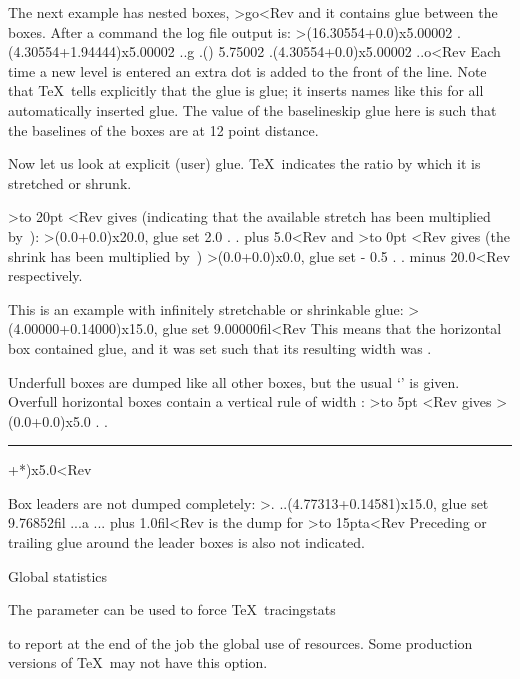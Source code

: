 The next example has nested boxes, 
\Ver>\vbox{\hbox{g}\hbox{o}}<Rev
and it contains  glue between the boxes.
After a  command the log file output is:
\Ver>\vbox(16.30554+0.0)x5.00002
.\hbox(4.30554+1.94444)x5.00002
..\tenroman g
.\glue(\baselineskip) 5.75002
.\hbox(4.30554+0.0)x5.00002
..\tenroman o<Rev
Each time a new level is entered an extra dot is added to
the front of the line. Note that \TeX\ tells explicitly
that the glue is  glue;
it inserts names like this for all automatically inserted glue.
The value of
the baselineskip glue here is such that the baselines of
the boxes are at 12 point distance.

Now let us look at explicit (user) glue. \TeX\ indicates the ratio
by which it is stretched or shrunk. 

\examples
\Ver>\hbox to 20pt {\kern10pt }<Rev
gives (indicating that the available stretch has been 
multiplied by~):
\Ver>\hbox(0.0+0.0)x20.0, glue set 2.0
.
. plus 5.0<Rev
and
\Ver>\hbox to 0pt {\kern10pt }<Rev
gives (the shrink has been multiplied by~)
\Ver>\hbox(0.0+0.0)x0.0, glue set - 0.5
.
. minus 20.0<Rev
respectively.
\>

This is an example with infinitely stretchable or shrinkable
glue:
\Ver>\hbox(4.00000+0.14000)x15.0, glue set 9.00000fil<Rev
This means that the horizontal box contained  glue, and
it was set such that its resulting width was \n{9pt}.

Underfull boxes are dumped like all other boxes, but
the usual `'
is given. Overfull horizontal boxes contain a vertical rule
of width :
\Ver>\hbox to 5pt {\kern10pt}<Rev gives
\Ver>\hbox(0.0+0.0)x5.0
.
.\rule(*+*)x5.0<Rev


Box leaders are not dumped completely:
\Ver>.
..\hbox(4.77313+0.14581)x15.0, glue set 9.76852fil
...\tenrm a
... plus 1.0fil<Rev
is the dump for
\Ver>\leaders\hbox to 15pt{\tenrm a\hfil}\hskip 40pt<Rev
Preceding or trailing glue around the leader
boxes is also not indicated.

\point Global statistics

The parameter  can be used to force \TeX\
\csterm tracingstats\par
to report at the end of the job the global use of resources.
Some production versions of \TeX\ may not have this option.

